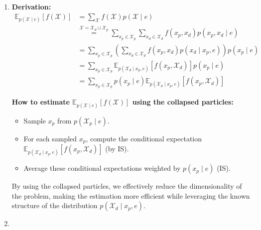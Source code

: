 \documentclass[a4 paper]{article}
\begin{document}
\begin{enumerate}
    \item {}


    \textbf{Derivation:}
    \begin{align*}
    \mathbb{E}_{p(\mathcal{X} \mid e)} [f(\mathcal{X})] &= \sum_{\mathcal{X}} f(\mathcal{X}) p(\mathcal{X} \mid e) \\
    &\stackrel{\mathcal{X} = \mathcal{X}_d \sqcup \mathcal{X}_p }{=} \sum_{x_p \in \mathcal{X}_p} \sum_{x_d \in \mathcal{X}_d} f(x_p, x_d) p(x_p, x_d \mid e) \\
    &= \sum_{x_p \in \mathcal{X}_p} \left( \sum_{x_d \in \mathcal{X}_d} f(x_p, x_d) p(x_d \mid x_p, e) \right) p(x_p \mid e) \\
    &= \sum_{x_p \in \mathcal{X}_p} \mathbb{E}_{p(\mathcal{X}_d \mid x_p, e)} [f(x_p, \mathcal{X}_d)] p(x_p \mid e) \\
    &= \sum_{x_p \in \mathcal{X}_p} p(x_p \mid e) \mathbb{E}_{p(\mathcal{X}_d \mid x_p, e)} [f(x_p, \mathcal{X}_d)]
    \end{align*}

    
    \textbf{How to estimate \( \mathbb{E}_{p(\mathcal{X} \mid e)} [f(\mathcal{X})] \) using the collapsed particles:}
    \begin{itemize}
        \item Sample \( x_p \) from \( p(\mathcal{X}_p \mid e) \).
        \item For each sampled \( x_p \), compute the conditional expectation \( \mathbb{E}_{p(\mathcal{X}_d \mid x_p, e)} [f(x_p, \mathcal{X}_d)] \) (by IS).
        \item Average these conditional expectations weighted by \( p(x_p \mid e) \) (IS).
    \end{itemize}
    
    By using the collapsed particles, we effectively reduce the dimensionality of the problem, making the estimation more efficient while leveraging the known structure of the distribution \( p(\mathcal{X}_d \mid x_p, e) \).

    


    
    \item {}
    

\end{enumerate}
\end{document}

